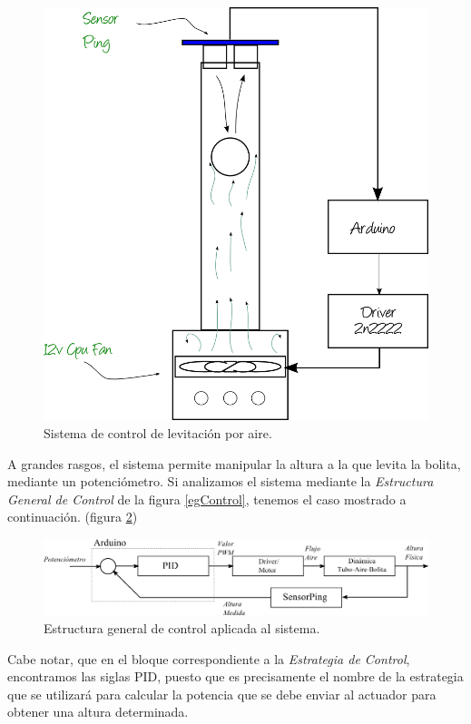\documentclass[letterpaper, 10pt]{report}
\begin{document}
\begin{figure}[h]
	\centering
	\includegraphics[scale=0.4]{levitron.png}
	\caption{Sistema de control de levitación por aire. \label{levitron1}}
\end{figure}	

A grandes rasgos, el sistema permite manipular la altura a la que levita la bolita, mediante un potenciómetro. Si analizamos el sistema mediante la \emph{Estructura General de Control} de la figura \ref{egControl}, tenemos el caso mostrado a continuación. (figura \ref{controlLevi})

\begin{figure}[h]
	\centering
	\includegraphics[scale=1]{controlLevi.png}
	\caption{Estructura general de control aplicada al sistema. \label{controlLevi}}
\end{figure}

Cabe notar, que en el bloque correspondiente a la \emph{Estrategia de Control}, encontramos las siglas PID, puesto que es precisamente el nombre de la estrategia que se utilizará para calcular la potencia que se debe enviar al actuador para obtener una altura determinada.
\end{document}
